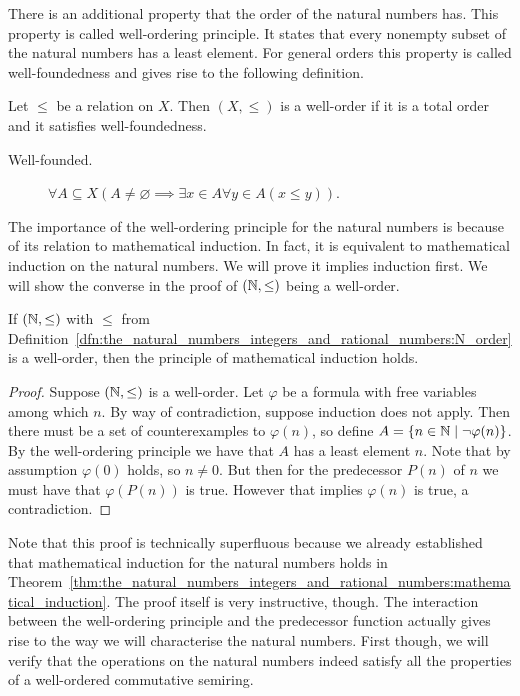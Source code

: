 \documentclass[../main.tex]{subfiles}
\begin{document}
There is an additional property that the order of the natural numbers has. This property is called well-ordering principle. It states that every nonempty subset of the natural numbers has a least element. For general orders this property is called well-foundedness and gives rise to the following definition.
\begin{definition}\label{dfn:the_natural_numbers_integers_and_rational_numbers:well_order}
    Let $\leq$ be a relation on $X$. Then $(X,\leq)$ is a well-order if it is a total order and it satisfies well-foundedness.
    \begin{description}
        \item[Well-founded.] $\forall A\subseteq X(A\neq\varnothing\implies\exists x\in A\forall y\in A(x\leq y))$.
    \end{description}
\end{definition}
The importance of the well-ordering principle for the natural numbers is because of its relation to mathematical induction. In fact, it is equivalent to mathematical induction on the natural numbers. We will prove it implies induction first. We will show the converse in the proof of $(\mathbb{N},\leq)$ being a well-order.
\begin{proposition}
    If $(\mathbb{N},\leq)$ with $\leq$ from Definition~\ref{dfn:the_natural_numbers_integers_and_rational_numbers:N_order} is a well-order, then the principle of mathematical induction holds.
\end{proposition}
\begin{proof}
    Suppose $(\mathbb{N},\leq)$ is a well-order. Let $\varphi$ be a formula with free variables among which $n$. By way of contradiction, suppose induction does not apply. Then there must be a set of counterexamples to $\varphi(n)$, so define $A=\{n\in\mathbb{N}\mid\lnot\varphi(n)\}$. By the well-ordering principle we have that $A$ has a least element $n$. Note that by assumption $\varphi(0)$ holds, so $n\neq0$. But then for the predecessor $P(n)$ of $n$ we must have that $\varphi(P(n))$ is true. However that implies $\varphi(n)$ is true, a contradiction.
\end{proof}
Note that this proof is technically superfluous because we already established that mathematical induction for the natural numbers holds in Theorem~\ref{thm:the_natural_numbers_integers_and_rational_numbers:mathematical_induction}. The proof itself is very instructive, though. The interaction between the well-ordering principle and the predecessor function actually gives rise to the way we will characterise the natural numbers. First though, we will verify that the operations on the natural numbers indeed satisfy all the properties of a well-ordered commutative semiring.
\end{document}
